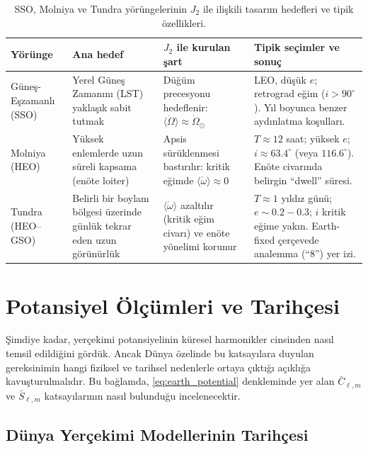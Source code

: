 \medskip
\begin{table}[h]
\centering
\captionsetup{skip=6pt}
\renewcommand{\arraystretch}{1.25}
\setlength{\tabcolsep}{6pt}
\begin{tabular}{p{2.6cm} p{3.4cm} p{3.6cm} p{5.2cm}}
\hline
\textbf{Yörünge} &
\textbf{Ana hedef} &
\textbf{$J_2$ ile kurulan şart} &
\textbf{Tipik seçimler ve sonuç} \\
\hline
Güneş-Eşzamanlı (SSO) &
Yerel Güneş Zamanını (LST) yaklaşık sabit tutmak &
Düğüm precesyonu hedeflenir:
$\langle\dot\Omega\rangle \approx \dot\Omega_{\odot}$ &
LEO, düşük $e$; retrograd eğim ($i>90^\circ$).
Yıl boyunca benzer aydınlatma koşulları. \\
\hline
Molniya (HEO) &
Yüksek enlemlerde uzun süreli kapsama (enöte loiter) &
Apsis sürüklenmesi bastırılır:
kritik eğimde $\langle\dot\omega\rangle \approx 0$ &
$T\approx 12$ saat; yüksek $e$;
$i\approx 63.4^\circ$ (veya $116.6^\circ$).
Enöte civarında belirgin ``dwell'' süresi. \\
\hline
Tundra (HEO--GSO) &
Belirli bir boylam bölgesi üzerinde günlük tekrar eden uzun görünürlük &
$\langle\dot\omega\rangle$ azaltılır (kritik eğim civarı) ve enöte yönelimi korunur &
$T\approx 1$ yıldız günü; $e\sim 0.2{-}0.3$;
$i$ kritik eğime yakın.
Earth-fixed çerçevede analemma (``8'') yer izi. \\
\hline
\end{tabular}
\caption{SSO, Molniya ve Tundra yörüngelerinin $J_2$ ile ilişkili tasarım hedefleri ve tipik özellikleri.}
\label{tab:special_orbits_summary}
\end{table}




\newpage
\section{Potansiyel Ölçümleri ve Tarihçesi}
\label{sec:measurements_history_estimation}

Şimdiye kadar, yerçekimi potansiyelinin küresel harmonikler cinsinden nasıl temsil edildiğini gördük. Ancak Dünya özelinde bu katsayılara duyulan gereksinimin hangi fiziksel ve tarihsel nedenlerle ortaya çıktığı açıklığa kavuşturulmalıdır.
Bu bağlamda, \eqref{eq:earth_potential} denkleminde yer alan
$\bar C_{\ell,m}$ ve $\bar S_{\ell,m}$ katsayılarının nasıl bulunduğu incelenecektir.


\subsection{Dünya Yerçekimi Modellerinin Tarihçesi}
\label{subsec:history_short}

